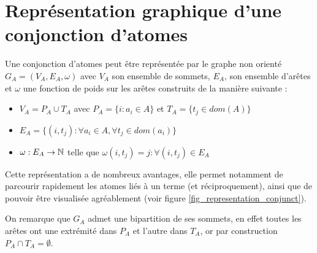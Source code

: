 \section{Représentation graphique d'une conjonction d'atomes}
\label{def_representation_conjonction}
Une conjonction d'atomes 
peut \^etre repr\'esent\'ee par le graphe non orient\'e $G_{A} = (V_{A},E_{A},\omega)$
avec $V_{A}$ son ensemble de sommets, $E_{A}$,
son ensemble d'ar\^etes et $\omega$ une fonction de poids sur les ar\^etes construits de la mani\`ere suivante :
\begin{itemize}
	\item $V_{A} = P_{A} \cup T_{A}$ avec $P_{A} = \{i : a_{i} \in A\}$ et 
	$T_{A} = \{t_{j} \in dom(A)\}$
	\item $E_{A} = \{(i,t_{j}) : \forall a_{i} \in A, \forall t_{j} \in dom(a_{i})\}$
	\item $\omega : E_A \rightarrow \mathbb{N}$ telle que
	$\omega(i,t_{j}) = j : \forall (i,t_{j}) \in E_{A}$
\end{itemize}

Cette représentation a de nombreux avantages, elle permet notamment de parcourir
rapidement les atomes liés à un terme (et réciproquement), ainsi que de pouvoir être
visualisée agréablement (voir figure \ref{fig_representation_conjunct}).


On remarque que %
	$G_{A}$ admet une bipartition de ses sommets, en effet toutes les ar\^etes ont 
	une extr\'emit\'e dans $P_{A}$ et l'autre dans $T_{A}$, or par construction $P_{A} 
	\cap T_{A} = \emptyset$.


